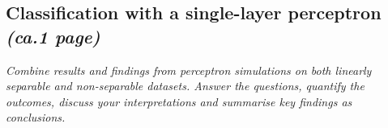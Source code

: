 \documentclass[a4paper]{article}
\begin{document}

\subsection{Classification with a single-layer perceptron \textit{(ca.1 page)}}
\textit{Combine results and findings from perceptron simulations on both linearly separable and non-separable datasets. Answer the questions, quantify the outcomes, discuss your interpretations and summarise key findings as conclusions.}
\end{document}
